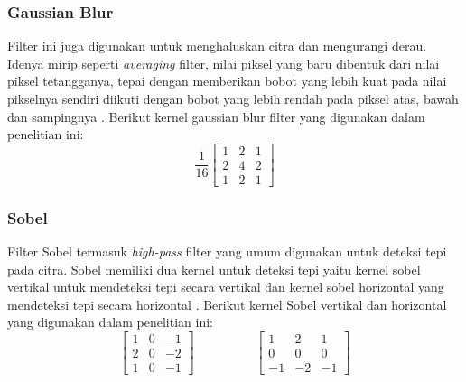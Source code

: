\subsubsection{Gaussian Blur}
Filter ini juga digunakan untuk menghaluskan citra dan mengurangi derau. Idenya mirip seperti \textit{averaging} filter, nilai piksel yang baru dibentuk dari nilai piksel tetangganya, tepai dengan memberikan bobot yang lebih kuat pada nilai pikselnya sendiri diikuti dengan bobot yang lebih rendah pada piksel atas, bawah dan sampingnya . Berikut kernel gaussian blur filter yang digunakan dalam penelitian ini:
\begin{equation}
    \label{kernel:mean2}
    \frac{1}{16}
    \left[
    \begin{matrix}
        1 & 2 & 1 \\
        2 & 4 & 2 \\
        1 & 2 & 1
    \end{matrix}
    \right]
\end{equation}

\subsubsection{Sobel}
Filter Sobel termasuk \textit{high-pass} filter yang umum digunakan untuk deteksi tepi pada citra. Sobel memiliki dua kernel untuk deteksi tepi yaitu kernel sobel vertikal untuk mendeteksi tepi secara vertikal dan kernel sobel horizontal yang mendeteksi tepi secara horizontal . Berikut kernel Sobel vertikal dan horizontal yang digunakan dalam penelitian ini:
\begin{equation}
    \label{kernel:sobel-h}
    \left[
    \begin{matrix}
        1 & 0 & -1 \\
        2 & 0 & -2 \\
        1 & 0 & -1
    \end{matrix}
    \right]
    \hspace{2cm}
    \left[
        \begin{matrix}
        1 & 2 & 1 \\
        0 & 0 & 0 \\
        -1 & -2 & -1
    \end{matrix}
    \right]
\end{equation}

